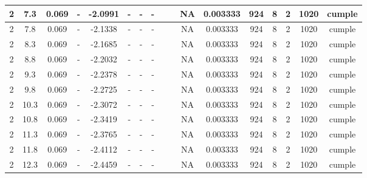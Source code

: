 \begin{table}[H]
{\begin{tabular}{|c|c|c|c|c|c|c|c|c|c|c|c|c|c|c|c|c|}
\hline
2   & 7.3 & 0.069 & -   & -2.0991 & -   & -   & -   &     &     & NA  & 0.003333 & 924 & 8   & 2   & 1020 & \cellcolor[rgb]{ .776,  .937,  .808}\textcolor[rgb]{ 0,  .38,  0}{cumple} \bigstrut\\
\hline
2   & 7.8 & 0.069 & -   & -2.1338 & -   & -   & -   &     &     & NA  & 0.003333 & 924 & 8   & 2   & 1020 & \cellcolor[rgb]{ .776,  .937,  .808}\textcolor[rgb]{ 0,  .38,  0}{cumple} \bigstrut\\
\hline
2   & 8.3 & 0.069 & -   & -2.1685 & -   & -   & -   &     &     & NA  & 0.003333 & 924 & 8   & 2   & 1020 & \cellcolor[rgb]{ .776,  .937,  .808}\textcolor[rgb]{ 0,  .38,  0}{cumple} \bigstrut\\
\hline
2   & 8.8 & 0.069 & -   & -2.2032 & -   & -   & -   &     &     & NA  & 0.003333 & 924 & 8   & 2   & 1020 & \cellcolor[rgb]{ .776,  .937,  .808}\textcolor[rgb]{ 0,  .38,  0}{cumple} \bigstrut\\
\hline
2   & 9.3 & 0.069 & -   & -2.2378 & -   & -   & -   &     &     & NA  & 0.003333 & 924 & 8   & 2   & 1020 & \cellcolor[rgb]{ .776,  .937,  .808}\textcolor[rgb]{ 0,  .38,  0}{cumple} \bigstrut\\
\hline
2   & 9.8 & 0.069 & -   & -2.2725 & -   & -   & -   &     &     & NA  & 0.003333 & 924 & 8   & 2   & 1020 & \cellcolor[rgb]{ .776,  .937,  .808}\textcolor[rgb]{ 0,  .38,  0}{cumple} \bigstrut\\
\hline
2   & 10.3 & 0.069 & -   & -2.3072 & -   & -   & -   &     &     & NA  & 0.003333 & 924 & 8   & 2   & 1020 & \cellcolor[rgb]{ .776,  .937,  .808}\textcolor[rgb]{ 0,  .38,  0}{cumple} \bigstrut\\
\hline
2   & 10.8 & 0.069 & -   & -2.3419 & -   & -   & -   &     &     & NA  & 0.003333 & 924 & 8   & 2   & 1020 & \cellcolor[rgb]{ .776,  .937,  .808}\textcolor[rgb]{ 0,  .38,  0}{cumple} \bigstrut\\
\hline
2   & 11.3 & 0.069 & -   & -2.3765 & -   & -   & -   &     &     & NA  & 0.003333 & 924 & 8   & 2   & 1020 & \cellcolor[rgb]{ .776,  .937,  .808}\textcolor[rgb]{ 0,  .38,  0}{cumple} \bigstrut\\
\hline
2   & 11.8 & 0.069 & -   & -2.4112 & -   & -   & -   &     &     & NA  & 0.003333 & 924 & 8   & 2   & 1020 & \cellcolor[rgb]{ .776,  .937,  .808}\textcolor[rgb]{ 0,  .38,  0}{cumple} \bigstrut\\
\hline
2   & 12.3 & 0.069 & -   & -2.4459 & -   & -   & -   &     &     & NA  & 0.003333 & 924 & 8   & 2   & 1020 & \cellcolor[rgb]{ .776,  .937,  .808}\textcolor[rgb]{ 0,  .38,  0}{cumple} \bigstrut\\

\end{tabular}}
\end{table}
